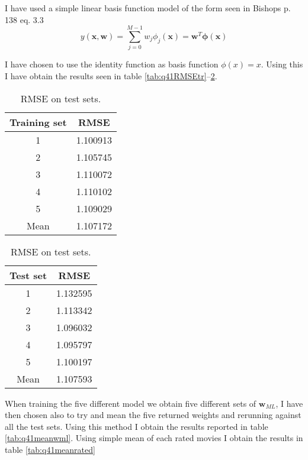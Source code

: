 I have used a simple linear basis function model of the form seen in Bishops p. 138 eq. 3.3
\begin{equation*}
y(\mathbf{x},\mathbf{w}) = \sum_{j=0}^{M-1} w_{j}\phi_{j}(\mathbf{x}) = \mathbf{w}^{T}\boldsymbol{\phi}(\mathbf{x})
\end{equation*}

I have chosen to use the identity function as basis function $\phi(x)
= x$. Using this I have obtain the results seen in table
\ref{tab:q41RMSEtr}--\ref{tab:q41RMSEte}.

\begin{table}[!htbp]
  \begin{minipage}[b]{0.5\linewidth}
    \centering
    \begin{tabular}{c|c}
      Training set & RMSE \\
      \hline
      1 & 1.100913 \\
      2 & 1.105745 \\
      3 & 1.110072 \\
      4 & 1.110102 \\
      5 & 1.109029 \\
      \hline
      Mean & 1.107172 \\
    \end{tabular}
    \caption{RMSE on training sets.}
    \label{tab:q41RMSEtr}
  \end{minipage}
  \hspace{0.5cm}
  \begin{minipage}[b]{0.5\linewidth}
    \centering
    \begin{tabular}{c|c}
      Test set & RMSE \\
      \hline
      1 & 1.132595 \\
      2 & 1.113342 \\
      3 & 1.096032 \\
      4 & 1.095797 \\
      5 & 1.100197 \\
      \hline
      Mean & 1.107593 \\
    \end{tabular}
    \caption{RMSE on test sets.}
    \label{tab:q41RMSEte}
  \end{minipage}
\end{table}

When training the five different model we obtain five different sets
of $\mathbf{w}_{ML}$, I have then chosen also to try and mean the five
returned weights and rerunning against all the test sets. Using this
method I obtain the results reported in table
\ref{tab:q41meanwml}. Using simple mean of each rated movies I obtain
the results in table \ref{tab:q41meanrated}

